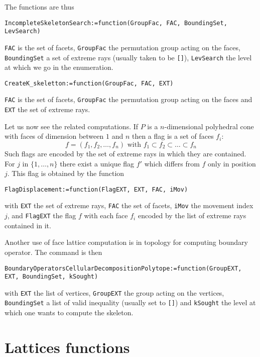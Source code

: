 \documentclass[12pt]{amsart}
\begin{document}
The functions are thus
\begin{verbatim}
IncompleteSkeletonSearch:=function(GroupFac, FAC, BoundingSet, LevSearch)
\end{verbatim}
{\tt FAC} is the set of facets, {\tt GroupFac} the permutation group acting
on the faces,
{\tt BoundingSet} a set of extreme rays (usually taken to be {\tt []}),
{\tt LevSearch} the level at which we go in the enumeration.

\begin{verbatim}
CreateK_skeletton:=function(GroupFac, FAC, EXT)
\end{verbatim}
{\tt FAC} is the set of facets, {\tt GroupFac} the permutation group acting
on the faces and {\tt EXT} the set of extreme rays.


Let us now see the related computations.
If $P$ is a $n$-dimensional polyhedral cone with faces of dimension between 
$1$ and $n$ then a flag is a set of faces $f_i$:
\begin{equation*}
f=(f_1, f_2,\dots, f_n) \mbox{~with~} f_1 \subset f_2 \subset \dots \subset f_n
\end{equation*}
Such flags are encoded by the set of extreme rays in which they are contained.
For $j$ in $\{1,\dots, n\}$ there exist a unique flag $f'$ which differs from
$f$ only in position $j$.
This flag is obtained by the function
\begin{verbatim}
FlagDisplacement:=function(FlagEXT, EXT, FAC, iMov)
\end{verbatim}
with {\tt EXT} the set of extreme rays, {\tt FAC} the set of facets, {\tt iMov} the movement index $j$, and {\tt FlagEXT} the flag $f$ with each face $f_i$ encoded by the list of extreme rays contained in it.


Another use of face lattice computation is in topology for computing
boundary operator. The command is then
\begin{verbatim}
BoundaryOperatorsCellularDecompositionPolytope:=function(GroupEXT, EXT, BoundingSet, kSought)
\end{verbatim}
with {\tt EXT} the list of vertices, {\tt GroupEXT} the group acting on the vertices, {\tt BoundingSet} a list of valid inequality (usually set to {\tt []}) and {\tt kSought} the level at which one wants to compute the skeleton.






\section{Lattices functions}
\end{document}

